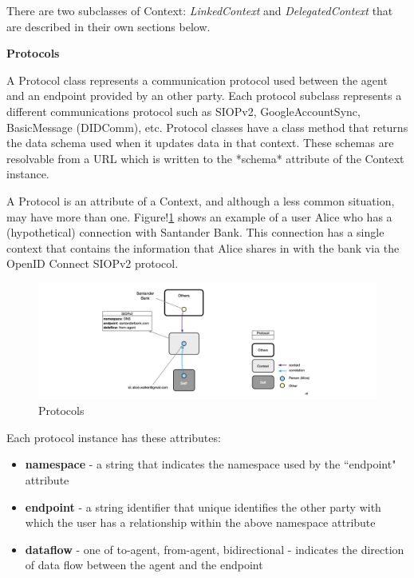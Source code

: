 \documentclass[11pt, oneside]{article}   	%
\begin{document}
There are two subclasses of Context: \emph{LinkedContext} and \emph{DelegatedContext} that are described in their own sections below.

\textbf{Protocols}

A Protocol class represents a communication protocol used between the agent and an endpoint provided by an other party. Each protocol subclass represents a different communications protocol such as SIOPv2, GoogleAccountSync, BasicMessage (DIDComm), etc.  Protocol classes have a class method that returns the data schema used when it updates data in that context. These schemas are resolvable from a URL which is written to the *schema* attribute of the Context instance.

A Protocol is an attribute of a Context, and although a less common situation, may have more than one. Figure!\ref{fig:protocol} shows an example of a user Alice who has a (hypothetical) connection with Santander Bank. This connection has a single context that contains the information that Alice shares in with the bank via the OpenID Connect SIOPv2 protocol.

\begin{figure}[htbp]
	\includegraphics[width=\textwidth]{./images/context-with-protocol.png}
	\caption{Protocols}
	\label{fig:protocol}
\end{figure}

Each protocol instance has these attributes:
\begin{itemize}
\item \textbf{namespace} - a string that indicates the namespace used by the ``endpoint" attribute
\item \textbf{endpoint} - a string identifier that unique identifies the other party with which the user has a relationship within the above namespace attribute
\item \textbf{dataflow} - one of {to-agent, from-agent, bidirectional} - indicates the direction of data flow between the agent and the endpoint
\end{itemize}
\end{document}
